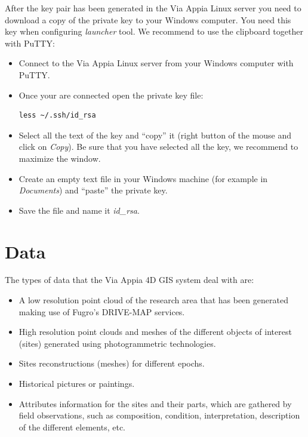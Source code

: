\documentclass[a4paper,11pt]{article}
\begin{document}
After the key pair has been generated in the Via Appia Linux server you need to download a copy of the private key to your Windows computer. You need this key when configuring \textit{launcher} tool.  We recommend to use the clipboard together with PuTTY:
\begin{itemize}
\item Connect to the Via Appia Linux server from your Windows computer with PuTTY.
\item Once your are connected open the private key file:
\begin{Verbatim}[fontfamily=courier,commandchars=\\\{\},fontsize=\footnotesize]
less ~/.ssh/id_rsa
\end{Verbatim}
\item Select all the text of the key and ``copy'' it (right button of the mouse and click on \textit{Copy}). Be sure that you have selected all the key, we recommend to maximize the window.
\item Create an empty text file in your Windows machine (for example in \textit{Documents}) and ``paste'' the private key.
\item Save the file and name it \textit{id\_rsa}.
\end{itemize}

\section{Data}
\label{sec:data}

The types of data that the Via Appia 4D GIS system deal with are:

\begin{itemize}
\item A low resolution point cloud of the research area that has been generated making use of Fugro’s DRIVE-MAP services. 
\item High resolution point clouds and meshes of the different objects of interest (sites) generated using photogrammetric technologies. 
\item Sites reconstructions (meshes) for different epochs. 
\item Historical pictures or paintings. 
\item Attributes information for the sites and their parts, which are gathered by field observations, such as composition, condition, interpretation, description of the different elements, etc. 
\end{itemize}
\end{document}
